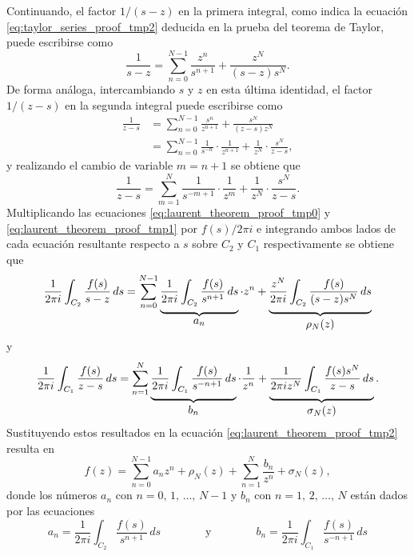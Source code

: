 \documentclass[a4paper]{report}
\begin{document}
Continuando, el factor \(1/(s-z)\) en la primera integral, como indica la ecuación \ref{eq:taylor_series_proof_tmp2} deducida en la prueba del teorema de Taylor, puede escribirse como
\begin{equation}\label{eq:laurent_theorem_proof_tmp0}
 \frac{1}{s-z}=\sum_{n=0}^{N-1}\frac{z^n}{s^{n+1}}+\frac{z^N}{(s-z)s^N}. 
\end{equation}
De forma análoga, intercambiando \(s\) y \(z\) en esta última identidad, el factor \(1/(z-s)\) en la segunda integral puede escribirse como
\begin{align*}
 \frac{1}{z-s}&=\sum_{n=0}^{N-1}\frac{s^n}{z^{n+1}}+\frac{s^N}{(z-s)z^N}\\
   &=\sum_{n=0}^{N-1}\frac{1}{s^{-n}}\cdot\frac{1}{z^{n+1}}+\frac{1}{z^N}\cdot\frac{s^N}{z-s},
\end{align*}
y realizando el cambio de variable \(m=n+1\) se obtiene que 
\begin{equation}\label{eq:laurent_theorem_proof_tmp1}
 \frac{1}{z-s}=\sum_{m=1}^N\frac{1}{s^{-m+1}}\cdot\frac{1}{z^m}+\frac{1}{z^N}\cdot\frac{s^N}{z-s}. 
\end{equation}
Multiplicando las ecuaciones \ref{eq:laurent_theorem_proof_tmp0} y \ref{eq:laurent_theorem_proof_tmp1} por \(f(s)/2\pi i\) e integrando ambos lados de cada ecuación resultante respecto a \(s\) sobre \(C_2\) y \(C_1\) respectivamente se obtiene que 
\[
 \frac{1}{2\pi i}\int_{C_2}\frac{f(s)}{s-z}\,ds=\sum_{n=0}^{N-1}\underbrace{\vphantom{\sum_{n=0}^{N-1}}\frac{1}{2\pi i}\int_{C_2}\frac{f(s)}{s^{n+1}}\,ds}_{\displaystyle a_n}\cdot z^n+\underbrace{\vphantom{\sum_{n=0}^{N-1}}\frac{z^N}{2\pi i}\int_{C_2}\frac{f(s)}{(s-z)s^N}\,ds}_{\displaystyle\rho_N(z)}
\]
y
\[
 \frac{1}{2\pi i}\int_{C_1}\frac{f(s)}{z-s}\,ds=\sum_{n=1}^N\underbrace{\vphantom{\sum_{n=0}^{N-1}}\frac{1}{2\pi i}\int_{C_1}\frac{f(s)}{s^{-n+1}}\,ds}_{\displaystyle b_n}\cdot\frac{1}{z^n}+\underbrace{\vphantom{\sum_{n=0}^{N-1}}\frac{1}{2\pi iz^N}\int_{C_1}\frac{f(s)s^N}{z-s}\,ds}_{\displaystyle\sigma_N(z)}.
\]
Sustituyendo estos resultados en la ecuación \ref{eq:laurent_theorem_proof_tmp2} resulta en
\begin{equation}\label{eq:laurent_theorem_proof_tmp3}
 f(z)=\sum_{n=0}^{N-1}a_nz^n+\rho_N(z)+\sum_{n=1}^N\frac{b_n}{z^n}+\sigma_N(z), 
\end{equation}
donde los números \(a_n\) con \(n=0,\,1,\,\dots,\,N-1\) y \(b_n\) con \(n=1,\,2,\,\dots,\,N\) están dados por las ecuaciones 
\begin{equation}\label{eq:laurent_theorem_proof_an_bn}
 a_n=\frac{1}{2\pi i}\int_{C_2}\frac{f(s)}{s^{n+1}}\,ds
 \qquad\qquad\textrm{y}\qquad\qquad
 b_n=\frac{1}{2\pi i}\int_{C_1}\frac{f(s)}{s^{-n+1}}\,ds 
\end{equation}
\end{document}
